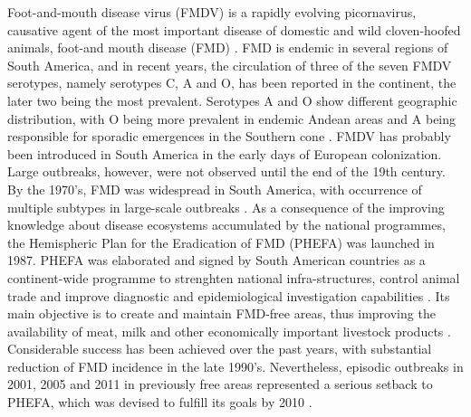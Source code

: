 \documentclass[10pt]{article}
\begin{document}
Foot-and-mouth disease virus (FMDV) is a rapidly evolving picornavirus, causative agent of the most important disease of domestic and wild cloven-hoofed animals, foot-and mouth disease (FMD) \cite{review}.
FMD is endemic in several regions of South America, and in recent years, the circulation of three of the seven FMDV serotypes, namely serotypes C, A and O, has been reported in the continent, the later two being the most prevalent.
Serotypes A and O show different  geographic distribution, with O being more prevalent in endemic Andean areas \cite{andean} and A being responsible for sporadic emergences in the Southern cone \cite{Perez2001,Malirat2012}.
FMDV has probably been introduced in South America in the early days of European colonization.
Large outbreaks, however, were not observed until the end of the 19th century.
By the 1970's, FMD was widespread in South America, with occurrence of multiple subtypes  in large-scale outbreaks \cite{Saraiva2003}.
As a consequence of the improving knowledge about disease ecosystems accumulated by the national programmes, the Hemispheric Plan for the Eradication of FMD (PHEFA) was launched in 1987. PHEFA was elaborated and signed by South American countries as a continent-wide programme to strenghten national infra-structures, control animal trade and improve diagnostic and epidemiological investigation capabilities \cite{review_eradication}. Its main objective is to create and maintain FMD-free areas, thus improving the availability of meat, milk and other economically important livestock products \cite{Saraiva2003,Saraiva2004,review_eradication,combining}. Considerable success has been achieved over the past years, with substantial reduction of FMD incidence in the late 1990's. Nevertheless, episodic outbreaks in 2001, 2005 and 2011 in previously free areas represented a serious setback to PHEFA, which was devised to fulfill its goals by 2010 \cite{Saraiva2003,Saraiva2004}.
\end{document}
